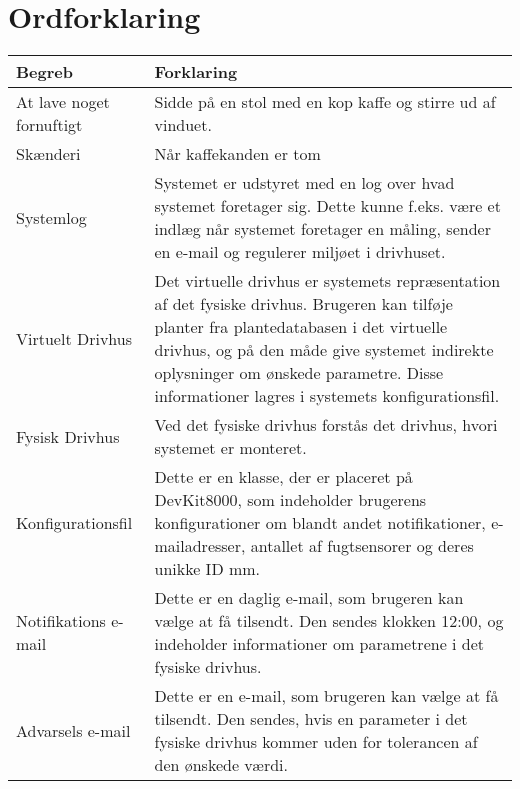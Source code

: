 \clearpage

\section{Ordforklaring}

\begin{table}[h]
\centering
\begin{tabularx}{/10}{| l | Z |}
\hline
\textbf{Begreb} & \textbf{Forklaring} \\\hline
	At lave noget fornuftigt & 
	Sidde på en stol med en kop kaffe og stirre ud af vinduet. \\\hline
	Skænderi &
Når kaffekanden er tom \\\hline
	Systemlog &
Systemet er udstyret med en log over hvad systemet foretager sig. Dette kunne f.eks. være et indlæg når systemet foretager en måling, sender en e-mail og regulerer miljøet i drivhuset. \\\hline
	Virtuelt Drivhus &
Det virtuelle drivhus er systemets repræsentation af det fysiske drivhus. Brugeren kan tilføje planter fra plantedatabasen i det virtuelle drivhus, og på den måde give systemet indirekte oplysninger om ønskede parametre. Disse informationer lagres i systemets konfigurationsfil. \\\hline
	Fysisk Drivhus &
Ved det fysiske drivhus forstås det drivhus, hvori systemet er monteret. \\\hline
	Konfigurationsfil &
Dette er en klasse, der er placeret på DevKit8000, som indeholder brugerens konfigurationer om blandt andet notifikationer, e-mailadresser, antallet af fugtsensorer og deres unikke ID mm. \\\hline
	Notifikations e-mail &
Dette er en daglig e-mail, som brugeren kan vælge at få tilsendt. Den sendes klokken 12:00, og indeholder informationer om parametrene i det fysiske drivhus. \\\hline
	Advarsels e-mail &
Dette er en e-mail, som brugeren kan vælge at få tilsendt. Den sendes, hvis en parameter i det fysiske drivhus kommer uden for tolerancen af den ønskede værdi. \\\hline
\end{tabularx}
\end{table}
\clearpage